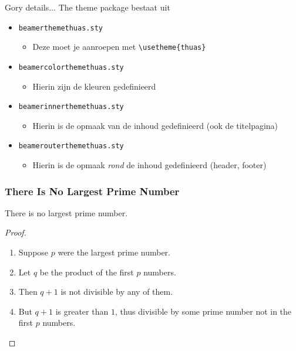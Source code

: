 \documentclass[fleqn,aspectratio=169,dutch]{beamer}
\begin{document}
\begin{frame}[fragile]{Gory details...}
The theme package bestaat uit
\begin{itemize}
\item \texttt{beamerthemethuas.sty}
\begin{itemize}
\item Deze moet je aanroepen met \lstinline|\usetheme{thuas}|
\end{itemize}
\item \texttt{beamercolorthemethuas.sty}
\begin{itemize}
\item Hierin zijn de kleuren gedefinieerd
\end{itemize}
\item \texttt{beamerinnerthemethuas.sty}
\begin{itemize}
\item Hierin is de opmaak van de inhoud gedefinieerd (ook de titelpagina)
\end{itemize}
\item \texttt{beamerouterthemethuas.sty}
\begin{itemize}
\item Hierin is de opmaak \emph{rond} de inhoud gedefinieerd (header, footer)
\end{itemize}
\end{itemize}
\end{frame}


\begin{frame} 
\frametitle{There Is No Largest Prime Number} 
\begin{theorem}
There is no largest prime number.
\end{theorem} 
\begin{proof}
\begin{enumerate} 
\item<1-| alert@1> Suppose $p$ were the largest prime number. 
\item<2-> Let $q$ be the product of the first $p$ numbers. 
\item<3-> Then $q+1$ is not divisible by any of them. 
\item<1-> But $q + 1$ is greater than $1$, thus divisible by some prime
number not in the first $p$ numbers.
\end{enumerate}
\end{proof}
\end{frame}

%
%
%
%

\beamerthemethuasbackframe
\end{document}
